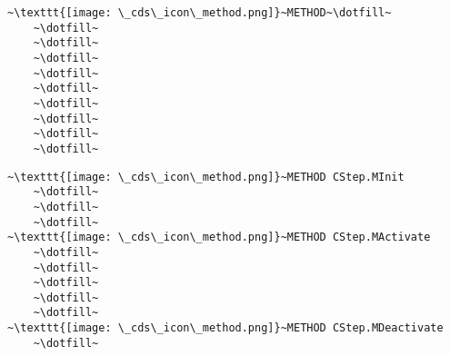 \pagebreak
\begin{UPSTIactivite}
    \begin{lstlisting}[numbers=none, escapechar=~, basicstyle=\Large, language=st]
~\texttt{[image: \_cds\_icon\_method.png]}~METHOD~\dotfill~
    ~\dotfill~
    ~\dotfill~
    ~\dotfill~
    ~\dotfill~
    ~\dotfill~
    ~\dotfill~
    ~\dotfill~
    ~\dotfill~
    ~\dotfill~
\end{lstlisting}
\end{UPSTIactivite}
\begin{UPSTIactivite}
    \begin{lstlisting}[numbers=none, escapechar=~, basicstyle=\Large, language=st]
~\texttt{[image: \_cds\_icon\_method.png]}~METHOD CStep.MInit 
    ~\dotfill~
    ~\dotfill~
    ~\dotfill~
~\texttt{[image: \_cds\_icon\_method.png]}~METHOD CStep.MActivate 
    ~\dotfill~
    ~\dotfill~
    ~\dotfill~
    ~\dotfill~
    ~\dotfill~
~\texttt{[image: \_cds\_icon\_method.png]}~METHOD CStep.MDeactivate
    ~\dotfill~
    \end{lstlisting}
\end{UPSTIactivite}

\pagebreak
\begin{UPSTIactivite}[][Utilisation]
    
\end{UPSTIactivite}